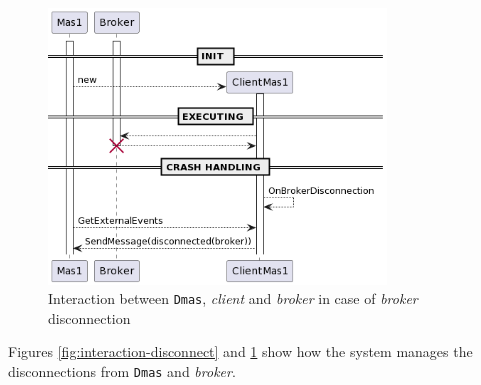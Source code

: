 \begin{figure}[ht!]
    \centering
    \includegraphics[width=0.8\textwidth]{figures/sequence-broker-crash.png}
    \caption{Interaction between \texttt{Dmas}, \textit{client} and \textit{broker} in case of \textit{broker} disconnection}
    \label{fig:interaction-disconnect-broker}
\end{figure}

Figures \ref{fig:interaction-disconnect} and \ref{fig:interaction-disconnect-broker} show how the system manages the disconnections from \texttt{Dmas} and \textit{broker}.
